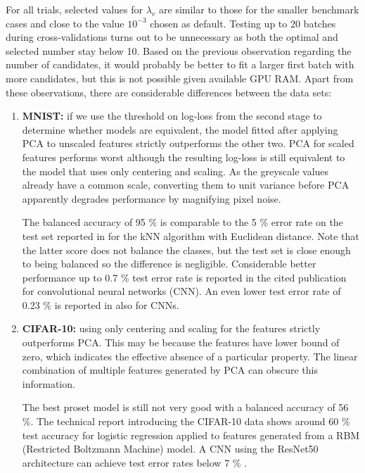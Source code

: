 %
For all trials, selected values for $\lambda_v$ are similar to those for the smaller benchmark cases and close to the value $10^{-3}$ chosen as default.
Testing up to 20 batches during cross-validations turns out to be unnecessary as both the optimal and selected number stay below 10.
Based on the previous observation regarding the number of candidates, it would probably be better to fit a larger first batch with more candidates, but this is not possible given available GPU RAM.
Apart from these observations, there are considerable differences between the data sets:
%
\begin{enumerate}
\item\textbf{MNIST:} if we use the threshold on log-loss from the second stage to determine whether models are equivalent, the model fitted after applying PCA to unscaled features strictly outperforms the other two.
PCA for scaled features performs worst although the resulting log-loss is still equivalent to the model that uses only centering and scaling.
As the greyscale values already have a common scale, converting them to unit variance before PCA apparently degrades performance by magnifying pixel noise.\par
%
The balanced accuracy of 95 \% is comparable to the 5 \% error rate on the test set reported in \cite{LeCun_98} for the kNN algorithm with Euclidean distance.
Note that the latter score does not balance the classes, but the test set is close enough to being balanced so the difference is negligible.
Considerable better performance up to 0.7 \% test error rate is reported in the cited publication for convolutional neural networks (CNN).
An even lower test error rate of 0.23 \% is reported in \cite{Ciresan_12} also for CNNs.
%
\item\textbf{CIFAR-10:} using only centering and scaling for the features strictly outperforms PCA.
This may be because the features have lower bound of zero, which indicates the effective absence of a particular property.
The linear combination of multiple features generated by PCA can obscure this information.\par
%
The best proset model is still not very good with a balanced accuracy of 56 \%.
The technical report \cite{Krizhevsky_09} introducing the CIFAR-10 data shows around 60 \% test accuracy for logistic regression applied to features generated from a RBM (Restricted Boltzmann Machine) model.
A CNN using the ResNet50 architecture can achieve test error rates below 7 \% \cite{He_15}.
\end{enumerate}
